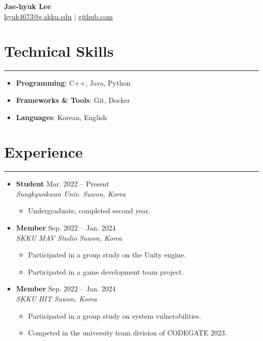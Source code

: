 \documentclass[letterpaper, 10pt]{article}
\begin{document}
 
\begin{center} 
\textbf{\LARGE Jae-hyuk Lee} \\ \vspace{2pt} 
\href{mailto:hyuk4673@g.skku.edu}{\underline{hyuk4673@g.skku.edu}} $|$ 
\href{https://github.com/hyuk4673}{\underline{github.com}} 
\end{center} 
\section*{Technical Skills} 
\hrule 
\vspace{4pt} 
\begin{itemize} 
\item[] \textbf{Programming}: C++, Java, Python%
\item[] \textbf{Frameworks \& Tools}: Git, Docker%
\item[] \textbf{Languages}: Korean, English%
\end{itemize} 
\section*{Experience} 
\hrule 
\vspace{4pt} 
\begin{itemize} 
\item[] 
\textbf{Student} \hfill Mar. 2022 -- Present \\ %
\textit{Sungkyunkwan Univ.} \hfill \textit{Suwon, Korea} 
\begin{itemize} 
\item Undergraduate, completed second year.
\end{itemize} 
\item[] 
\textbf{Member} \hfill Sep. 2022 -- Jan. 2024 \\ %
\textit{SKKU MAV Studio} \hfill \textit{Suwon, Korea} 
\begin{itemize} 
\item Participated in a group study on the Unity engine.
\item Participated in a game development team project.
\end{itemize} 
\item[] 
\textbf{Member} \hfill Sep. 2022 -- Jan. 2024 \\ %
\textit{SKKU HIT} \hfill \textit{Suwon, Korea} 
\begin{itemize} 
\item Participated in a group study on system vulnerabilities.
\item Competed in the university team division of CODEGATE 2023.
\end{itemize}
\end{itemize} 
\end{document}
